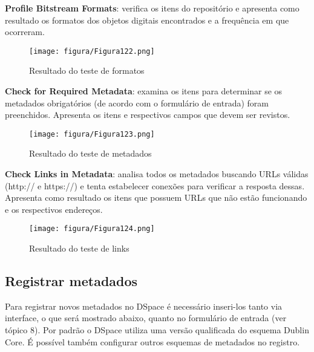 \documentclass[12pt,hidelinks]{article}
\begin{document}
    \textbf{Profile Bitstream Formats}: verifica os itens do repositório e apresenta como resultado os formatos dos objetos digitais encontrados e a frequência em que ocorreram.
    
    \begin{figure}[!htp]
                \centering
                \texttt{[image: figura/Figura122.png]}
                \caption{Resultado do teste de formatos}
            \label{Rotulo}
        \end{figure}
    
\newpage
    
    \textbf{Check for Required Metadata}: examina os itens para determinar se os metadados obrigatórios (de acordo com o formulário de entrada) foram preenchidos. Apresenta os itens e respectivos campos que devem ser revistos.
    
    \begin{figure}[!htp]
                \centering
                \texttt{[image: figura/Figura123.png]}
                \caption{Resultado do teste de metadados}
            \label{Rotulo}
        \end{figure}
    
    
    \textbf{Check Links in Metadata}: analisa todos os metadados buscando URLs válidas (http:// e https://) e tenta estabelecer conexões para verificar a resposta dessas. Apresenta como resultado os itens que possuem URLs que não estão funcionando e os respectivos endereços.
    
    \begin{figure}[!htp]
                \centering
                \texttt{[image: figura/Figura124.png]}
                \caption{Resultado do teste de links}
            \label{Rotulo}
        \end{figure}

\newpage
    
    \subsection{Registrar metadados}
    
    Para registrar novos metadados no DSpace é necessário inseri-los tanto via interface, o que será mostrado abaixo, quanto no formulário de entrada (ver tópico 8). Por padrão o DSpace utiliza uma versão qualificada do esquema Dublin Core. É possível também configurar outros esquemas de metadados no registro.
    
    \singlespacing
    
\end{document}
